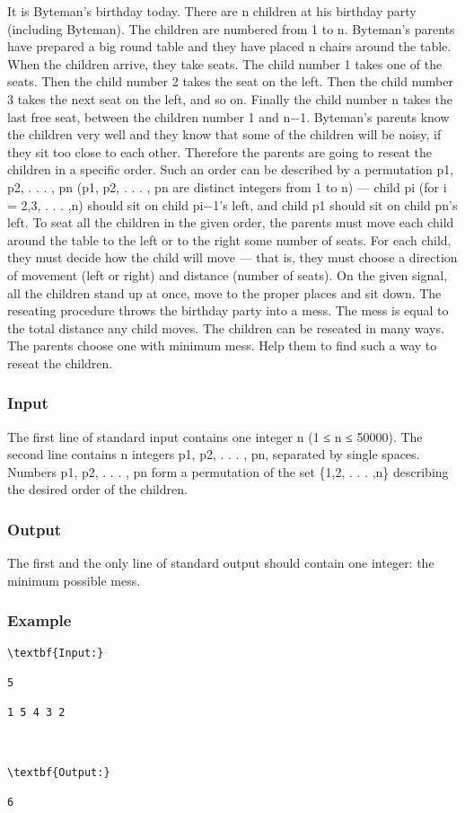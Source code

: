 

It is Byteman’s birthday today. There are n children at his birthday party (including Byteman). The children are numbered from 1 to n. Byteman’s parents have prepared a big round table and they have placed n chairs around the table. When the children arrive, they take seats. The child number 1 takes one of the seats. Then the child number 2 takes the seat on the left. Then the child number 3 takes the next seat on the left, and so on. Finally the child number n takes the last free seat, between the children number 1 and n−1.  Byteman’s parents know the children very well and they know that some of the children will be noisy, if they sit too close to each other. Therefore the parents are going to reseat the children in a specific order. Such an order can be described by a permutation p1, p2, . . . , pn (p1, p2, . . . , pn are distinct integers from 1 to n) — child pi (for i = 2,3, . . . ,n) should sit on child pi−1’s left, and child p1 should sit on child pn’s left. To seat all the children in the given order, the parents must move each child around the table to the left or to the right some number of seats. For each child, they must decide how the child will move — that is, they must choose a direction of movement (left or right) and distance (number of seats). On the given signal, all the children stand up at once, move to the proper places and sit down. The reseating procedure throws the birthday party into a mess. The mess is equal to the total distance any child moves. The children can be reseated in many ways. The parents choose one with minimum mess. Help them to find such a way to reseat the children.

 

 

\subsubsection{Input}

The first line of standard input contains one integer n (1 ≤ n ≤ 50000). The second line contains n integers p1, p2, . . . , pn, separated by single spaces. Numbers p1, p2, . . . , pn form a permutation of the set \{1,2, . . . ,n\} describing the desired order of the children.

 

 

\subsubsection{Output}

The first and the only line of standard output should contain one integer: the minimum possible mess.

 

 

\subsubsection{Example}
\begin{verbatim}
\textbf{Input:}

5

1 5 4 3 2



\textbf{Output:}

6

\end{verbatim}